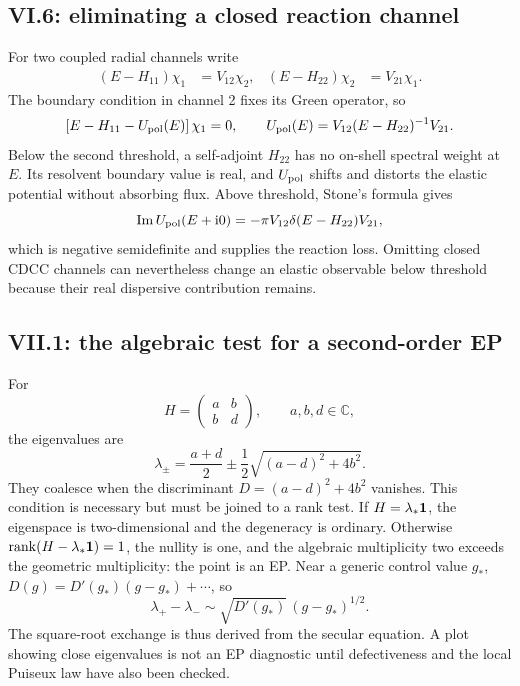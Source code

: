 \subsection*{VI.6: eliminating a closed reaction channel}

For two coupled radial channels write
\begin{align}
  (E-H_{11})\chi_1&=V_{12}\chi_2,
  &(E-H_{22})\chi_2&=V_{21}\chi_1.
\end{align}
The boundary condition in channel 2 fixes its Green operator, so
\begin{equation}
  \left[E-H_{11}-U_{\mathrm{pol}}(E)\right]\chi_1=0,
  \qquad
  U_{\mathrm{pol}}(E)=V_{12}(E-H_{22})^{-1}V_{21}.
\end{equation}
Below the second threshold, a self-adjoint $H_{22}$ has no on-shell spectral
weight at $E$.  Its resolvent boundary value is real, and $U_{\mathrm{pol}}$ shifts
and distorts the elastic potential without absorbing flux.  Above threshold,
Stone's formula gives
\begin{equation}
  \operatorname{Im} U_{\mathrm{pol}}(E+\mathrm{i}0)
  =-\pi V_{12}\delta(E-H_{22})V_{21},
\end{equation}
which is negative semidefinite and supplies the reaction loss.  Omitting
closed CDCC channels can nevertheless change an elastic observable below
threshold because their real dispersive contribution remains.

\subsection*{VII.1: the algebraic test for a second-order EP}

For
\begin{equation}
  H=\begin{pmatrix}a&b\\b&d\end{pmatrix},
  \qquad a,b,d\in\mathbb C,
\end{equation}
the eigenvalues are
\begin{equation}
  \lambda_\pm=\frac{a+d}{2}
  \pm\frac12\sqrt{(a-d)^2+4b^2}.
\end{equation}
They coalesce when the discriminant
$D=(a-d)^2+4b^2$ vanishes.  This condition is necessary but must be joined to
a rank test.  If $H=\lambda_*\mathbf{1}$, the eigenspace is two-dimensional and
the degeneracy is ordinary.  Otherwise
$\operatorname{rank}(H-\lambda_*\mathbf{1})=1$, the nullity is one, and the algebraic
multiplicity two exceeds the geometric multiplicity: the point is an EP.
Near a generic control value $g_*$, $D(g)=D'(g_*)(g-g_*)+\cdots$, so
\begin{equation}
  \lambda_+-\lambda_-
  \sim\sqrt{D'(g_*)}\,(g-g_*)^{1/2}.
\end{equation}
The square-root exchange is thus derived from the secular equation.  A plot
showing close eigenvalues is not an EP diagnostic until defectiveness and the
local Puiseux law have also been checked.

